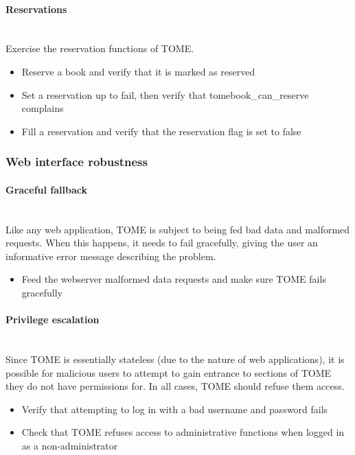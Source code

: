 \documentclass[12pt,titlepage]{article}
\begin{document}
\paragraph{Reservations}
\hspace{1pt}\\ Exercise the reservation functions of TOME.
\begin{itemize}
	\item Reserve a book and verify that it is marked as reserved
	\item Set a reservation up to fail, then verify that tomebook\_can\_reserve complains
	\item Fill a reservation and verify that the reservation flag is set to false
\end{itemize}

\subsubsection{Web interface robustness}
\paragraph{Graceful fallback}
\hspace{1pt}\\ Like any web application, TOME is subject to being fed bad data and malformed requests.  When this happens, it needs to fail gracefully, giving the user an informative error message describing the problem.
\begin{itemize}
	\item Feed the webserver malformed data requests and make sure TOME fails gracefully
\end{itemize}

\paragraph{Privilege escalation}
\hspace{1pt}\\ Since TOME is essentially stateless (due to the nature of web applications), it is possible for malicious users to attempt to gain entrance to sections of TOME they do not have permissions for.  In all cases, TOME should refuse them access.
\begin{itemize}
	\item Verify that attempting to log in with a bad username and password fails
	\item Check that TOME refuses access to administrative functions when logged in as a non-administrator
\end{itemize}
\end{document}
